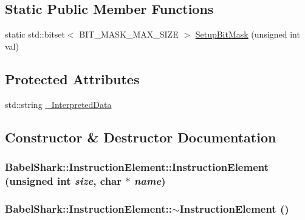 \subsection*{Static Public Member Functions}
\begin{CompactItemize}
\item 
static std::bitset$<$ BIT\_\-MASK\_\-MAX\_\-SIZE $>$ \hyperlink{class_babel_shark_1_1_instruction_element_c1c5ebe0551be16e29ea91fd46b39339}{SetupBitMask} (unsigned int val)
\end{CompactItemize}
\subsection*{Protected Attributes}
\begin{CompactItemize}
\item 
std::string \hyperlink{class_babel_shark_1_1_instruction_element_01c033e3d23cf2ecc64807520ac706aa}{\_\-InterpretedData}
\end{CompactItemize}


\subsection{Constructor \& Destructor Documentation}
\hypertarget{class_babel_shark_1_1_instruction_element_1eba7f61aa5a545d9a18c5f43260a183}{
\subsubsection[{InstructionElement}]{\setlength{\rightskip}{0pt plus 5cm}BabelShark::InstructionElement::InstructionElement (unsigned int {\em size}, \/  char $\ast$ {\em name})}}
\label{class_babel_shark_1_1_instruction_element_1eba7f61aa5a545d9a18c5f43260a183}


\hypertarget{class_babel_shark_1_1_instruction_element_f1cfd6c4aa3851ea72839b8486f6861f}{
\subsubsection[{$\sim$InstructionElement}]{\setlength{\rightskip}{0pt plus 5cm}BabelShark::InstructionElement::$\sim$InstructionElement ()}}
\label{class_babel_shark_1_1_instruction_element_f1cfd6c4aa3851ea72839b8486f6861f}




